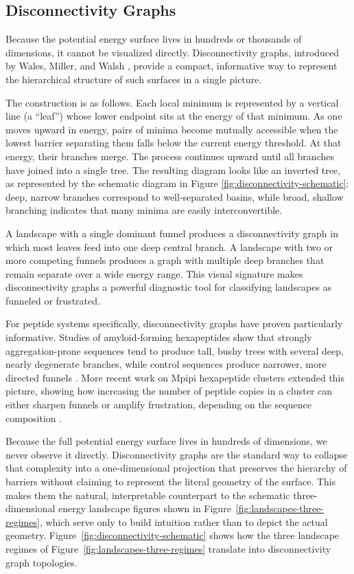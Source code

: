 \subsection{Disconnectivity Graphs}

Because the potential energy surface lives in hundreds or thousands of
dimensions, it cannot be visualized directly. Disconnectivity graphs, introduced
by Wales, Miller, and Walsh \cite{Wales1998Archetypal}, provide a compact, informative way to represent the hierarchical structure of such surfaces in a
single picture.

The construction is as follows. Each local minimum is represented by a vertical
line (a ``leaf'') whose lower endpoint sits at the energy of that minimum. As
one moves upward in energy, pairs of minima become mutually accessible when the
lowest barrier separating them falls below the current energy threshold. At
that energy, their branches merge. The process continues upward until all
branches have joined into a single tree. The resulting diagram looks like an
inverted tree, as represented by the schematic diagram in Figure \ref{fig:disconnectivity-schematic}: deep, narrow branches correspond to well-separated basins, while
broad, shallow branching indicates that many minima are easily interconvertible.

A landscape with a single dominant funnel produces a disconnectivity graph in
which most leaves feed into one deep central branch. A landscape with two or
more competing funnels produces a graph with multiple deep branches that remain
separate over a wide energy range. This visual signature makes disconnectivity
graphs a powerful diagnostic tool for classifying landscapes as funneled or
frustrated.

For peptide systems specifically, disconnectivity graphs have proven
particularly informative. Studies of amyloid-forming hexapeptides show that
strongly aggregation-prone sequences tend to produce tall, bushy trees with
several deep, nearly degenerate branches, while control sequences produce
narrower, more directed funnels \cite{Wales2023PeptideTrees,Roder2018HexLandscapes}.
More recent work on Mpipi hexapeptide clusters extended this picture, showing
how increasing the number of peptide copies in a cluster can either sharpen
funnels or amplify frustration, depending on the sequence composition
\cite{Nicy2024Mpipi}.


Because the full potential energy surface lives in hundreds of dimensions, we
never observe it directly. Disconnectivity graphs are the standard way to
collapse that complexity into a one-dimensional projection that preserves the
hierarchy of barriers without claiming to represent the literal geometry of the
surface. This makes them the natural, interpretable counterpart to the
schematic three-dimensional energy landscape figures shown in
Figure~\ref{fig:landscapes-three-regimes}, which serve only to build intuition
rather than to depict the actual geometry.
Figure~\ref{fig:disconnectivity-schematic} shows how the three landscape
regimes of Figure~\ref{fig:landscapes-three-regimes} translate into
disconnectivity graph topologies.

